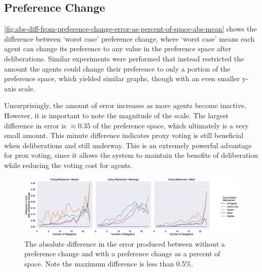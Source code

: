 \subsection{Preference Change}\label{subsec:results-shift}
\autoref{fig:abs-diff-from-preference-change-error-as-percent-of-space-abs-mean} shows
the difference between `worst case' preference change, where `worst case' means each
agent can change its preference to any value in the preference space after
deliberations.
Similar experiments were performed that instead restricted the amount the agents
could change their preference to only a portion of the preference space, which
yielded similar graphs, though with an even smaller y-axis scale.

Unsurprisingly, the amount of error increases as more agents become inactive.
However, it is important to note the magnitude of the scale.
The largest difference in error is $\approx 0.35$ of the preference space,
which ultimately is a very small amount.
This minute difference indicates proxy voting is still beneficial when deliberations
and still underway.
This is an extremely powerful advantage for prox voting, since it allows the system
to maintain the benefits of deliberation while reducing the voting cost for agents.

\begin{landscape}
    \begin{figure}[p]
        \centering
        \includegraphics[scale=0.55]
        {content/chapter2/figures/abs_diff_from_preference_change_error_as_percent_of_space_abs_mean}
        \caption{
            The absolute difference in the error produced between without a
            preference change and with a preference change as a percent of space.
            Note the maximum difference is less than 0.5\%.
        }
        \label{fig:abs-diff-from-preference-change-error-as-percent-of-space-abs-mean}
    \end{figure}
\end{landscape}

